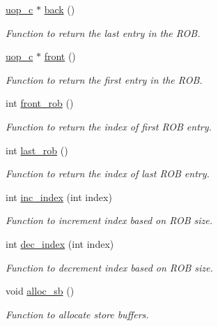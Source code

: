 \begin{DoxyCompactItemize}
\hyperlink{classuop__c}{uop\_\-c} $\ast$ \hyperlink{classrob__c_ae5de4ac5001c37b7319f65719a3696f4}{back} ()
\begin{DoxyCompactList}\small\item\em Function to return the last entry in the ROB. \item\end{DoxyCompactList}\item 
\hyperlink{classuop__c}{uop\_\-c} $\ast$ \hyperlink{classrob__c_a29054a5cce081ec28010c3297969d136}{front} ()
\begin{DoxyCompactList}\small\item\em Function to return the first entry in the ROB. \item\end{DoxyCompactList}\item 
int \hyperlink{classrob__c_a82dad6afef399c54579d9eb56598f0de}{front\_\-rob} ()
\begin{DoxyCompactList}\small\item\em Function to return the index of first ROB entry. \item\end{DoxyCompactList}\item 
int \hyperlink{classrob__c_a300a5778d8dd844dc2bdcc8d259d083a}{last\_\-rob} ()
\begin{DoxyCompactList}\small\item\em Function to return the index of last ROB entry. \item\end{DoxyCompactList}\item 
int \hyperlink{classrob__c_a1c1c52d3db2c7e5b62ba95d174b58b62}{inc\_\-index} (int index)
\begin{DoxyCompactList}\small\item\em Function to increment index based on ROB size. \item\end{DoxyCompactList}\item 
int \hyperlink{classrob__c_aac2eed61e8bbc2d092f8b5774df27fee}{dec\_\-index} (int index)
\begin{DoxyCompactList}\small\item\em Function to decrement index based on ROB size. \item\end{DoxyCompactList}\item 
void \hyperlink{classrob__c_a5706f098aeab44bdd4d2750510736d18}{alloc\_\-sb} ()
\begin{DoxyCompactList}\small\item\em Function to allocate store buffers. \item\end{DoxyCompactList}\item 

\end{DoxyCompactItemize}
